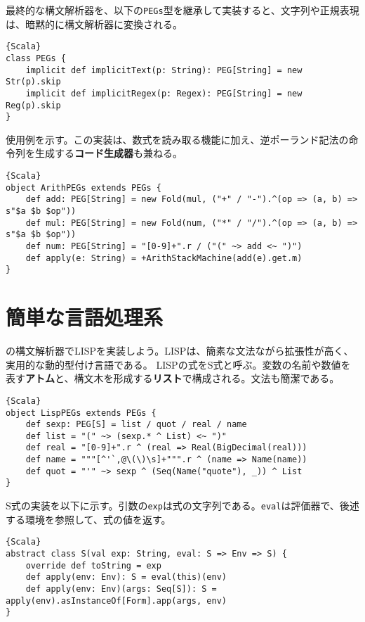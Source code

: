 \documentclass[10pt,a4paper]{book}
\begin{document}
最終的な構文解析器を、以下の\texttt{PEGs}型を継承して実装すると、文字列や正規表現は、暗黙的に構文解析器に変換される。

\begin{Verbatim}{Scala}
class PEGs {
	implicit def implicitText(p: String): PEG[String] = new Str(p).skip
	implicit def implicitRegex(p: Regex): PEG[String] = new Reg(p).skip
}
\end{Verbatim}

使用例を示す。この実装は、数式を読み取る機能に加え、逆ポーランド記法の命令列を生成する\textbf{コード生成器}も兼ねる。

\begin{Verbatim}{Scala}
object ArithPEGs extends PEGs {
	def add: PEG[String] = new Fold(mul, ("+" / "-").^(op => (a, b) => s"$a $b $op"))
	def mul: PEG[String] = new Fold(num, ("*" / "/").^(op => (a, b) => s"$a $b $op"))
	def num: PEG[String] = "[0-9]+".r / ("(" ~> add <~ ")")
	def apply(e: String) = +ArithStackMachine(add(e).get.m)
}
\end{Verbatim}

\section{簡単な言語処理系}

の構文解析器でLISPを実装しよう。LISPは、簡素な文法ながら拡張性が高く、実用的な動的型付け言語である。
LISPの式をS式と呼ぶ。変数の名前や数値を表す\textbf{アトム}と、構文木を形成する\textbf{リスト}で構成される。文法も簡潔である。

\begin{Verbatim}{Scala}
object LispPEGs extends PEGs {
	def sexp: PEG[S] = list / quot / real / name
	def list = "(" ~> (sexp.* ^ List) <~ ")" 
	def real = "[0-9]+".r ^ (real => Real(BigDecimal(real)))
	def name = """[^'`,@\(\)\s]+""".r ^ (name => Name(name))
	def quot = "'" ~> sexp ^ (Seq(Name("quote"), _)) ^ List
}
\end{Verbatim}

S式の実装を以下に示す。引数の\texttt{exp}は式の文字列である。\texttt{eval}は評価器で、後述する環境を参照して、式の値を返す。

\begin{Verbatim}{Scala}
abstract class S(val exp: String, eval: S => Env => S) {
	override def toString = exp
	def apply(env: Env): S = eval(this)(env)
	def apply(env: Env)(args: Seq[S]): S = apply(env).asInstanceOf[Form].app(args, env)
}
\end{Verbatim}
\end{document}
